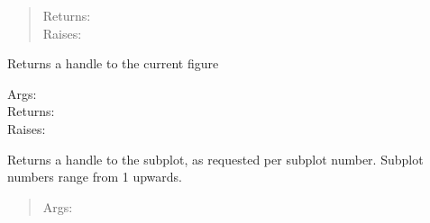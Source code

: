 \documentclass[a4paper,10pt,english]{sphinxmanual}
\begin{document}
\begin{fulllineitems}
\begin{fulllineitems}
\begin{quote}
\begin{description}
\item[{Returns:}] \leavevmode
{}

\item[{Raises:}] \leavevmode
{}

\end{description}
\end{quote}

\end{fulllineitems}


\begin{fulllineitems}
\label{ryplot:pyradi.ryplot.Plotter.getPlot}
Returns a handle to the current figure
\begin{description}
\item[{Args:}] \leavevmode
{}

\item[{Returns:}] \leavevmode
{}

\item[{Raises:}] \leavevmode
{}

\end{description}

\end{fulllineitems}


\begin{fulllineitems}
\label{ryplot:pyradi.ryplot.Plotter.getSubPlot}
Returns a handle to the subplot, as requested per subplot number.
Subplot numbers range from 1 upwards.
\begin{quote}
\begin{description}
\item[{Args:}] \leavevmode
{}


\end{description}
\end{quote}
\end{fulllineitems}
\end{fulllineitems}
\end{document}
